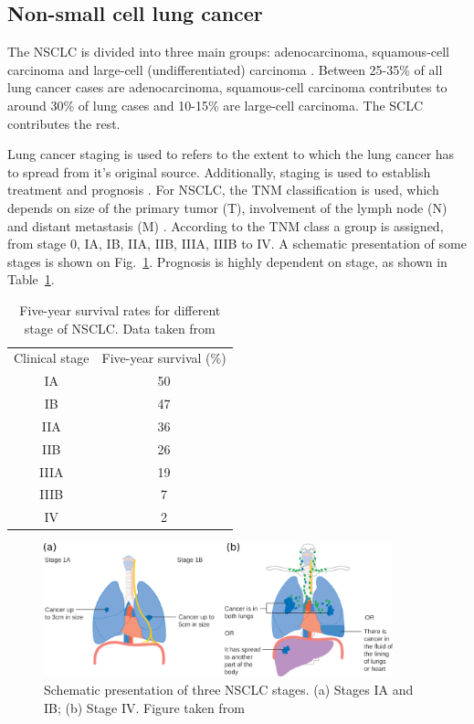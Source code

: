 \documentclass[type=dr, dr=rernat, accentcolor=tud7b,colorbacktitle, bigchapter, openright, twoside, 12pt ]{tudthesis}
\begin{document}
\subsection{Non-small cell lung cancer}

The NSCLC is divided into three main groups: adenocarcinoma, squamous-cell carcinoma and large-cell (undifferentiated) carcinoma \cite{Kasper2015}.
Between 25-35\% of all lung cancer cases are adenocarcinoma, squamous-cell carcinoma contributes to around 30\% of lung cases and 10-15\% are large-cell carcinoma. The SCLC contributes the rest. 

Lung cancer staging is used to refers to the extent to which the lung cancer has to spread from it's original source. Additionally, staging is used to establish treatment and prognosis \cite{Chheang2013}. For NSCLC, the TNM classification is used, which depends on
size of the primary tumor (T), involvement of the lymph node (N) and distant metastasis (M) \cite{Kasper2015}. According to the TNM class a group is assigned, from stage 0, IA, IB, IIA, IIB, IIIA, IIIB to IV. 
A schematic presentation of some stages is shown on Fig.~\ref{Fig:Stages}. Prognosis is highly dependent on stage, as shown in Table~\ref{tab:prognosis}.

\begin{table}[H]
  \centering
  \caption{Five-year survival rates for different stage of NSCLC. Data taken from \cite{Rami2009}}
  \begin{tabular}{|c|c|}
   \hline
   \hline
Clinical stage & Five-year survival (\%) \\
IA & 50 \\
IB & 47 \\
IIA & 36 \\
IIB & 26 \\
IIIA & 19 \\
IIIB & 7 \\
IV & 2 \\
\hline
\hline
  \end{tabular}
  \label{tab:prognosis}
\end{table}

\begin{figure}[H]
\begin{center}
\includegraphics[width=0.9\textwidth]{./Images/Stages.png}
\caption{Schematic presentation of three NSCLC stages. (a) Stages IA and IB; (b) Stage IV. Figure taken from \cite{CancerStage}}
\label{Fig:Stages}
\end{center}
\end{figure}
\end{document}
